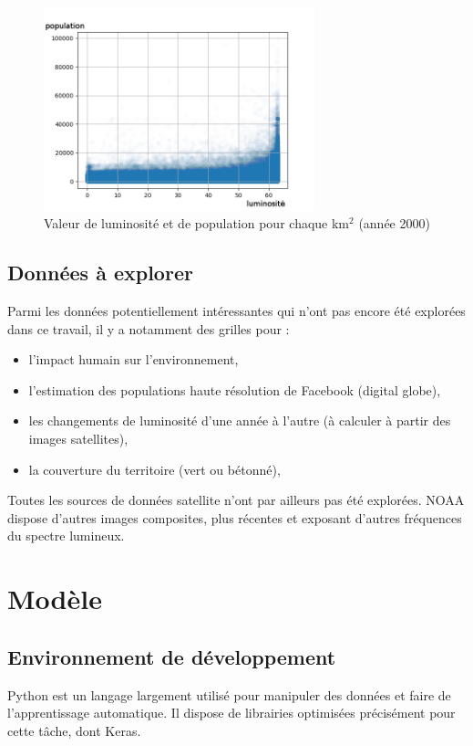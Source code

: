 \documentclass[a4paper, 11pt]{report}
\begin{document}
\begin{figure}
	\centering
	\includegraphics[width=0.7\textwidth]{img/lightpop_scatter.png}
	\caption{Valeur de luminosité et de population pour chaque km$^2$ (année 2000)}
	\label{lightpop_scatter}
\end{figure}

\section{Données à explorer}
Parmi les données potentiellement intéressantes qui n'ont pas encore été explorées dans ce travail, il y a notamment des grilles pour :
\begin{itemize}
	\item l'impact humain sur l'environnement,
	\item l'estimation des populations haute résolution de Facebook (digital globe),
	\item les changements de luminosité d'une année à l'autre (à calculer à partir des images satellites),
	\item la couverture du territoire (vert ou bétonné),
\end{itemize}
Toutes les sources de données satellite n'ont par ailleurs pas été explorées. NOAA dispose d'autres images composites, plus récentes et exposant d'autres fréquences du spectre lumineux.

\chapter{Modèle}
\section{Environnement de développement}
Python est un langage largement utilisé pour manipuler des données et faire de l'apprentissage automatique. Il dispose de librairies optimisées précisément pour cette tâche, dont Keras.
\end{document}
